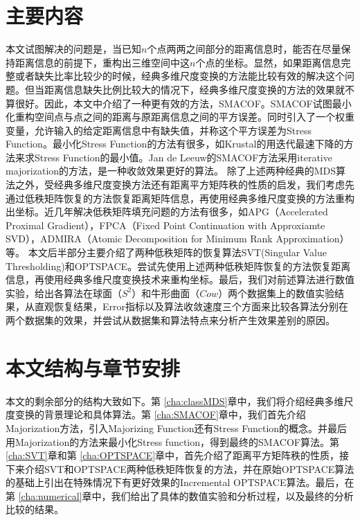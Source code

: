 \section{主要内容}
本文试图解决的问题是，当已知$n$个点两两之间部分的距离信息时，能否在尽量保持距离信息的前提下，重构出三维空间中这$n$个点的坐标。显然，如果距离信息完整或者缺失比率比较少的时候，经典多维尺度变换的方法能比较有效的解决这个问题。但当距离信息缺失比例比较大的情况下，经典多维尺度变换的方法的效果就不算很好。因此，本文中介绍了一种更有效的方法，SMACOF。SMACOF试图最小化重构空间点与点之间的距离与原距离信息之间的平方误差。同时引入了一个权重变量，允许输入的给定距离信息中有缺失值，并称这个平方误差为Stress Function。最小化Stress Function的方法有很多，如Krustal\cite{kruskal1964multidimensional}的用迭代最速下降的方法来求Stress Function的最小值。Jan de Leeuw\cite{de2011applications}的SMACOF方法采用iterative majorization的方法，是一种收敛效果更好的算法。
除了上述两种经典的MDS算法之外，受经典多维尺度变换方法还有距离平方矩阵秩的性质的启发，我们考虑先通过低秩矩阵恢复的方法恢复距离矩阵信息，再使用经典多维尺度变换的方法重构出坐标。近几年解决低秩矩阵填充问题的方法有很多，如APG\cite{toh2010accelerated}（Accelerated Proximal Gradient），FPCA\cite{ma2011fixed}（Fixed Point Continuation with Approxiamte SVD），ADMIRA\cite{lee2010admira}（Atomic Decomposition for Minimum Rank Approximation）等。
本文后半部分主要介绍了两种低秩矩阵的恢复算法SVT(Singular Value Thresholding)\cite{cai2010singular}和OPTSPACE\cite{keshavan2010matrix}。尝试先使用上述两种低秩矩阵恢复的方法恢复距离信息，再使用经典多维尺度变换技术来重构坐标。最后，我们对前述算法进行数值实验，给出各算法在球面（$S^2$）和牛形曲面（$Cow$）两个数据集上的数值实验结果，从直观恢复结果，Error指标以及算法收敛速度三个方面来比较各算法分别在两个数据集的效果，并尝试从数据集和算法特点来分析产生效果差别的原因。

\section{本文结构与章节安排}
本文的剩余部分的结构大致如下。第 \ref{cha:classMDS}章中，我们将介绍经典多维尺度变换的背景理论和具体算法。第
\ref{cha:SMACOF}章中，我们首先介绍Majorization方法，引入Majorizing Function还有Stress Function的概念。并最后用Majorization的方法来最小化Stress function，得到最终的SMACOF算法。第 \ref{cha:SVT}章和第 \ref{cha:OPTSPACE}章中，首先介绍了距离平方矩阵秩的性质，接下来介绍SVT和OPTSPACE两种低秩矩阵恢复的方法，并在原始OPTSPACE算法的基础上引出在特殊情况下有更好效果的Incremental OPTSPACE算法。最后，在第 \ref{cha:numerical}章中，我们给出了具体的数值实验和分析过程，以及最终的分析比较的结果。